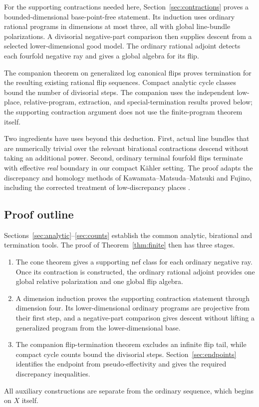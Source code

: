 For the supporting contractions needed here, Section~\ref{sec:contractions}
proves a bounded-dimensional base-point-free statement. Its induction
uses ordinary rational programs in dimensions at most three, all with
global line-bundle polarizations. A divisorial negative-part comparison
then supplies descent from a selected lower-dimensional good model.
The ordinary rational adjoint detects each fourfold negative ray and
gives a global algebra for its flip.

The companion theorem on generalized log canonical flips
\cite[Theorem~1.1]{OAI:Termination-of-generalized-log-canonical-flips-on-compact-Kahler-fourfolds-October-5-2026}
proves termination for the resulting existing rational flip sequences.
Compact analytic cycle classes bound the number of divisorial steps.
The companion uses the independent low-place, relative-program,
extraction, and special-termination results proved below; the supporting
contraction argument does not use the finite-program theorem itself.

Two ingredients have uses beyond this deduction. First, actual line
bundles that are numerically trivial over the relevant birational
contractions descend without taking an additional power. Second,
ordinary terminal fourfold flips terminate with effective \emph{real}
boundary in our compact Kähler setting. The proof adapts the
discrepancy and homology methods of Kawamata--Matsuda--Matsuki and
Fujino, including the corrected treatment of low-discrepancy places
\cite{KMM1987,Fujino2004,Fujino2005Addendum}.

\subsection{Proof outline}

Sections~\ref{sec:analytic}--\ref{sec:counts} establish the common
analytic, birational and termination tools. The proof of
Theorem~\ref{thm:finite} then has three stages.
\begin{enumerate}[label=\textup{\arabic*.}]
\item The cone theorem gives a supporting nef class for each ordinary
negative ray. Once its contraction is constructed, the ordinary
rational adjoint provides one global relative polarization and one
global flip algebra.
\item A dimension induction proves the supporting contraction
statement through dimension four. Its lower-dimensional ordinary
programs are projective from their first step, and a negative-part
comparison gives descent without lifting a generalized program from
the lower-dimensional base.
\item The companion flip-termination theorem excludes an infinite
flip tail, while compact cycle counts bound the divisorial steps.
Section~\ref{sec:endpoints} identifies the endpoint from
pseudo-effectivity and gives the required discrepancy inequalities.
\end{enumerate}
All auxiliary constructions are separate from the ordinary sequence,
which begins on $X$ itself.

